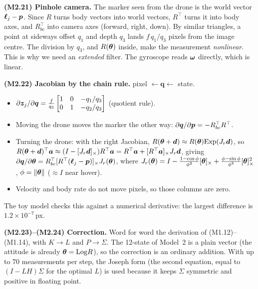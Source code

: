 \textbf{(M2.21) Pinhole camera.} The marker seen from the drone is the world vector $\bm\ell_j-\bm{p}$. Since $R$ turns body
vectors into world vectors, $R^\top$ turns it into body axes, and $R_{bc}^\top$ into camera axes (forward, right,
down). By similar triangles, a point at sideways offset $q_1$ and depth $q_3$ lands $f\,q_1/q_3$ pixels from the image
centre. The division by $q_3$, and $R(\bm{\theta})$ inside, make the measurement \emph{nonlinear}. This is why we need an
\emph{extended} filter. The gyroscope reads $\bm{\omega}$ directly, which is linear.

\textbf{(M2.22) Jacobian by the chain rule.} pixel $\leftarrow\bm q\leftarrow$ state.
\begin{itemize}
\item $\partial\bm{z}_j/\partial\bm q=\frac{f}{q_3}\begin{bmatrix}1&0&-q_1/q_3\\0&1&-q_2/q_3\end{bmatrix}$ (quotient rule).
\item Moving the drone moves the marker the other way: $\partial\bm q/\partial\bm{p}=-R_{bc}^\top R^\top$.
\item Turning the drone: with the right Jacobian, $R(\bm{\theta}+\bm d)\approx R(\bm{\theta})\mathrm{Exp}(J_r\bm d)$, so
      $R(\bm{\theta}+\bm d)^\top\bm a\approx(I-[J_r\bm d]_{\times})R^\top\bm a=R^\top\bm a+[R^\top\bm a]_{\times}J_r\bm d$, giving
      $\partial\bm q/\partial\bm{\theta}=R_{bc}^\top[R^\top(\bm\ell_j-\bm{p})]_{\times}J_r(\bm{\theta})$, where
      $J_r(\bm{\theta})=I-\frac{1-\cos\phi}{\phi^2}[\bm{\theta}]_{\times}+\frac{\phi-\sin\phi}{\phi^3}[\bm{\theta}]_{\times}^2$, $\phi=\|\bm{\theta}\|$
      ($\approx I$ near hover).
\item Velocity and body rate do not move pixels, so those columns are zero.
\end{itemize}
The toy model checks this against a numerical derivative: the largest difference is $1.2\times10^{-7}$\,px.

\textbf{(M2.23)--(M2.24) Correction.} Word for word the derivation of (M1.12)--(M1.14), with $K\to L$ and $P\to\Sigma$.
The 12-state of Model~2 is a plain vector (the attitude is already $\bm{\theta}=\mathrm{Log} R$), so the correction is an ordinary
addition. With up to 70 measurements per step, the Joseph form (the second equation, equal to $(I-LH)\Sigma$ for the
optimal $L$) is used because it keeps $\Sigma$ symmetric and positive in floating point.

